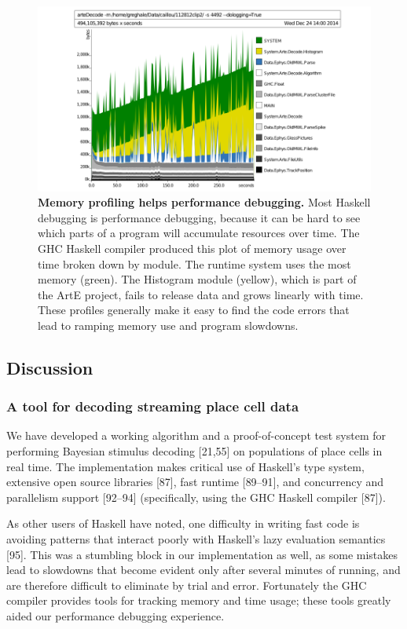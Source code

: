 \documentclass[]{article}
\begin{document}
\begin{figure}[htbp]
\centering
\includegraphics{./finalFigs/arteDecodeProfile.png}
\caption{\textbf{Memory profiling helps performance debugging.} Most
Haskell debugging is performance debugging, because it can be hard to
see which parts of a program will accumulate resources over time. The
GHC Haskell compiler produced this plot of memory usage over time broken
down by module. The runtime system uses the most memory (green). The
Histogram module (yellow), which is part of the ArtE project, fails to
release data and grows linearly with time. These profiles generally make
it easy to find the code errors that lead to ramping memory use and
program slowdowns.}
\end{figure}

\subsection{Discussion}

\subsubsection{A tool for decoding streaming place cell data}

We have developed a working algorithm and a proof-of-concept test system
for performing Bayesian stimulus decoding {[}21,55{]} on populations of
place cells in real time. The implementation makes critical use of
Haskell's type system, extensive open source libraries {[}87{]}, fast
runtime {[}89--91{]}, and concurrency and parallelism support
{[}92--94{]} (specifically, using the GHC Haskell compiler {[}87{]}).

As other users of Haskell have noted, one difficulty in writing fast
code is avoiding patterns that interact poorly with Haskell's lazy
evaluation semantics {[}95{]}. This was a stumbling block in our
implementation as well, as some mistakes lead to slowdowns that become
evident only after several minutes of running, and are therefore
difficult to eliminate by trial and error. Fortunately the GHC compiler
provides tools for tracking memory and time usage; these tools greatly
aided our performance debugging experience.
\end{document}
